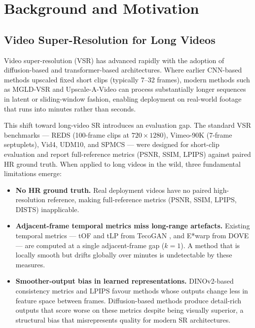 \section{Background and Motivation}

\subsection{Video Super-Resolution for Long Videos}

Video super-resolution (VSR) has advanced rapidly with the adoption of diffusion-based and transformer-based
architectures. Where earlier CNN-based methods upscaled fixed short clips (typically 7--32 frames), modern
methods such as MGLD-VSR \cite{he_mgld_2024} and Upscale-A-Video \cite{zhou_upscale_2024} can process
substantially longer sequences in latent or sliding-window fashion, enabling deployment on real-world footage
that runs into minutes rather than seconds.

This shift toward long-video SR introduces an evaluation gap. The standard VSR benchmarks --- REDS (100-frame
clips at $720\!\times\!1280$), Vimeo-90K (7-frame septuplets), Vid4, UDM10, and SPMCS --- were designed
for short-clip evaluation and report full-reference metrics (PSNR, SSIM, LPIPS) against paired HR ground
truth. When applied to long videos in the wild, three fundamental limitations emerge:

\begin{itemize}
    \item \textbf{No HR ground truth.} Real deployment videos have no paired high-resolution reference,
          making full-reference metrics (PSNR, SSIM, LPIPS, DISTS) inapplicable.
    \item \textbf{Adjacent-frame temporal metrics miss long-range artefacts.} Existing temporal metrics
          --- tOF and tLP from TecoGAN \cite{chu_tecogan_2020}, and E*warp from DOVE \cite{yang_dove_2024}
          --- are computed at a single adjacent-frame gap ($k{=}1$). A method that is locally smooth
          but drifts globally over minutes is undetectable by these measures.
    \item \textbf{Smoother-output bias in learned representations.} DINOv2-based consistency metrics and
          LPIPS favour methods whose outputs change less in feature space between frames. Diffusion-based
          methods produce detail-rich outputs that score worse on these metrics despite being visually
          superior, a structural bias that misrepresents quality for modern SR architectures.
\end{itemize}

